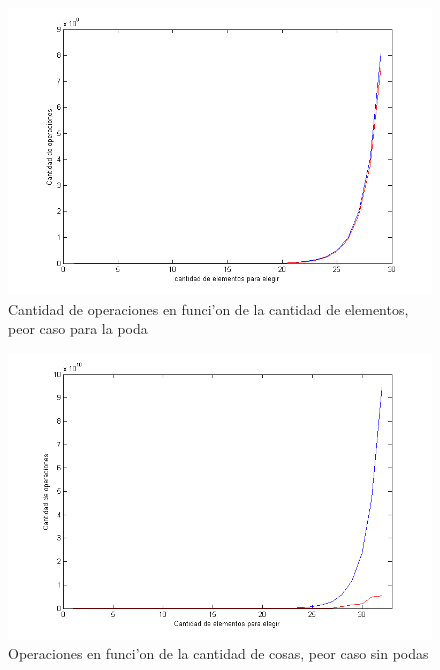 \begin{figure}[H]
\centering
\includegraphics[scale=0.7]{../../codigo/ejercicio2/benchmark/graficos/operaciones_peor_caso_poda/peorCasoConPoda.png}
\caption{Cantidad de operaciones en funci'on de la cantidad de elementos, peor caso para la poda}
\label{Ej2fig2}
\end{figure}

\begin{figure}[H]
\centering
\includegraphics[scale=0.7]{../../codigo/ejercicio2/benchmark/graficos/operaciones_peor_caso_poda/peorCasoSinPoda.png}
\caption{Operaciones en funci'on de la cantidad de cosas, peor caso sin podas }
\label{Ej2fig3}
\end{figure}

